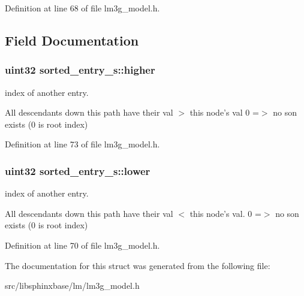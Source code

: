 \-Definition at line 68 of file lm3g\-\_\-model.\-h.



\subsection{\-Field \-Documentation}
\subsubsection[{higher}]{\setlength{\rightskip}{0pt plus 5cm}uint32 {\bf sorted\-\_\-entry\-\_\-s\-::higher}}\label{structsorted__entry__s_a0b7f0225403703a4daa3780593db7237}


index of another entry. 

\-All descendants down this path have their val $>$ this node's val 0 =$>$ no son exists (0 is root index) 

\-Definition at line 73 of file lm3g\-\_\-model.\-h.

\subsubsection[{lower}]{\setlength{\rightskip}{0pt plus 5cm}uint32 {\bf sorted\-\_\-entry\-\_\-s\-::lower}}\label{structsorted__entry__s_a248960abac597c0f615ab01822f6d559}


index of another entry. 

\-All descendants down this path have their val $<$ this node's val. 0 =$>$ no son exists (0 is root index) 

\-Definition at line 70 of file lm3g\-\_\-model.\-h.



\-The documentation for this struct was generated from the following file\-:\begin{DoxyCompactItemize}
\item 
src/libsphinxbase/lm/lm3g\-\_\-model.\-h\end{DoxyCompactItemize}
